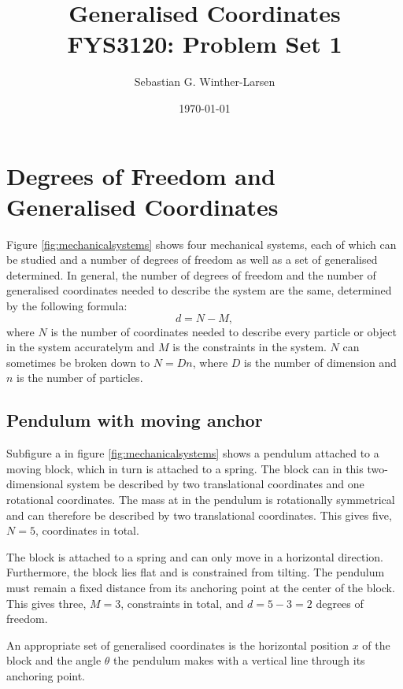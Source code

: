 \documentclass[11pt]{amsart}
\title[FYS3120: Problem Set 1]{Generalised Coordinates \\ \hrulefill\small{ FYS3120: Problem Set 1 }\hrulefill}
\author{Sebastian G. Winther-Larsen}
\date{\today}
\begin{document}
\maketitle

\tableofcontents

\section{Degrees of Freedom and Generalised Coordinates}

Figure \ref{fig:mechanicalsystems} shows four mechanical systems, each of which can be studied and a number of degrees of freedom as well as a set of generalised determined. In general, the number of degrees of freedom and the number of generalised coordinates needed to describe the system are the same, determined by the following formula:
\begin{equation}
\label{eq:dof}
d = N - M,
\end{equation}
where $N$ is the number of coordinates needed to describe every particle or object in the system accuratelym and $M$ is the constraints in the system. $N$ can sometimes be broken down to $N = Dn$, where $D$ is the number of dimension and $n$ is the number of particles.

\subsection{Pendulum with moving anchor}
Subfigure a in figure \ref{fig:mechanicalsystems} shows a pendulum attached to a moving block, which in turn is attached to a spring. The block can in this two-dimensional system be described by two translational coordinates and one rotational coordinates. The mass at in the pendulum is rotationally symmetrical and can therefore be described by two translational coordinates. This gives five, $N=5$, coordinates in total. 

The block is attached to a spring and can only move in a horizontal direction. Furthermore, the block lies flat and is constrained from tilting. The pendulum must remain a fixed distance from its anchoring point at the center of the block. This gives three, $M=3$, constraints in total, and $d = 5 - 3 = 2$ degrees of freedom.

An appropriate set of generalised coordinates is the horizontal position $x$ of the block and the angle $\theta$ the pendulum makes with a vertical line through its anchoring point.
\end{document}
